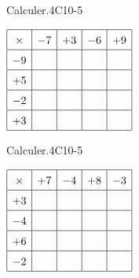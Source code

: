 


\begin{EXO}{Calculer.}{4C10-5}

 $\def\arraystretch{1.5}\begin{array}{|c|c|c|c|c|}
    \hline
    \times & -7 & +3 & -6 & +9 \\
    \hline
    -9 &  &  & &  \\
    \hline
    +5 & & & & \\
    \hline
    -2 & & & & \\
    \hline
    +3 & & & & \\
    \hline
    \end{array}$
\end{EXO}

\begin{EXO}{Calculer.}{4C10-5}

 $\def\arraystretch{1.5}\begin{array}{|c|c|c|c|c|}
    \hline
    \times & +7 & -4 & +8 & -3 \\
    \hline
    +3 &  &  & &  \\
    \hline
    -4 & & & & \\
    \hline
    +6 & & & & \\
    \hline
    -2 & & & & \\
    \hline
    \end{array}$
\end{EXO}

